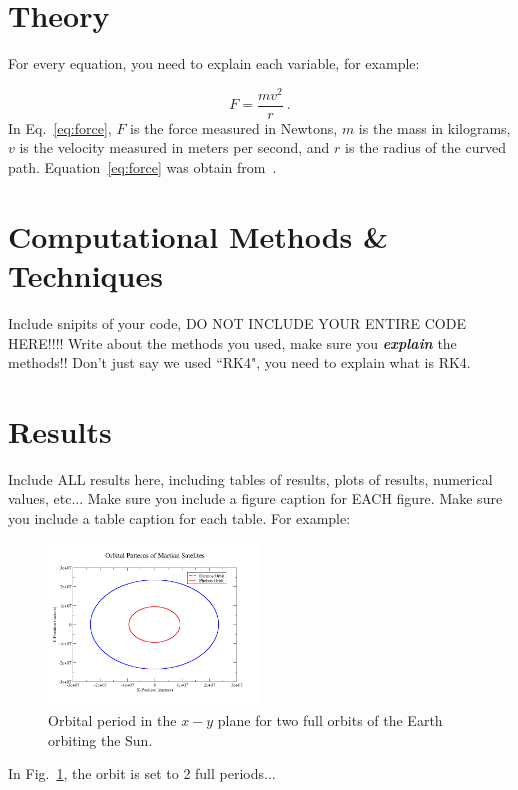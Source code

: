 \documentclass[11pt]{article}
\begin{document}
\section{Theory}
\noindent For every equation, you need to explain each variable, for example:

\begin{equation}
\label{eq:force}
F=\dfrac{mv^2}{r}~.
\end{equation}
\noindent In Eq.~\eqref{eq:force}, $F$ is the force measured in Newtons, $m$ is the
mass in kilograms, $v$ is the velocity measured in meters per second, and $r$ is
the radius of the curved path.  Equation~\eqref{eq:force} was obtain from~\cite{uni}.


\section{Computational Methods \& Techniques}
\noindent Include snipits of your code, DO NOT INCLUDE YOUR ENTIRE CODE HERE!!!!  
Write about the methods you used, make sure you \textbf{\textit{explain}} the methods!!  Don't
just say we used ``RK4", you need to explain what is RK4.

\section{Results}
\noindent Include ALL results here, including tables of results, plots of results, numerical values, etc...
Make sure you include a figure caption for EACH figure.  Make sure you include a table caption for each table.
For example:
\begin{figure}[ht]
\centering
\includegraphics[width=0.5\textwidth, angle =-90]{../presentation/orbits}
\caption{Orbital period in the $x-y$ plane for two full orbits of the Earth orbiting the Sun.}
\label{fig:graph}
\end{figure}
\noindent In Fig.~\ref{fig:graph}, the orbit is set to 2 full periods...
\end{document}
